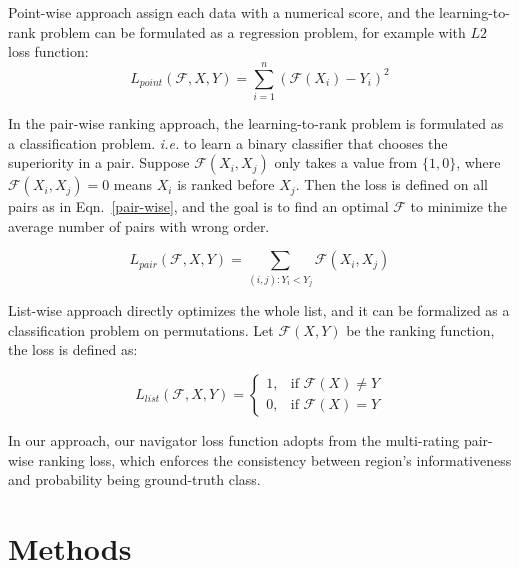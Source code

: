 \documentclass[runningheads]{llncs}
\begin{document}
Point-wise approach assign each data with a numerical score, and the learning-to-rank problem can be formulated as a regression problem,  for example with $L2$ loss function:
\begin{equation}
	\label{point-wise}
	L_{point}(\mathcal F, X, Y) = \sum_{i=1}^n (\mathcal F(X_i)-Y_i)^2 
\end{equation}

In the pair-wise ranking approach, the learning-to-rank problem is formulated as a classification problem. \emph{i.e.} to learn a binary classifier that chooses the superiority in a pair. Suppose $\mathcal F(X_i,X_j)$ only takes a value from $\{1, 0\}$, where $\mathcal F(X_i,X_j) = 0$ means $X_i$ is ranked before $X_j$. Then the loss is defined on all pairs as in Eqn.~\ref{pair-wise}, and the goal is to find an optimal $\mathcal F$ to minimize the average number of pairs with wrong order.

\begin{equation}
	\label{pair-wise}
	L_{pair}(\mathcal F, X, Y) = \sum_{(i,j):Y_i < Y_j} \mathcal F(X_i, X_j)
\end{equation}

List-wise approach directly optimizes the whole list, and it can be formalized as a classification problem on permutations. Let $\mathcal F(X, Y)$ be the ranking function, the loss is defined as:

\begin{equation}
	\label{list-wise}
	L_{list}(\mathcal F, X, Y)= 
	\begin{cases}
    	1,   & \text{if  }\mathcal F(X) \neq Y \\
    	0,   & \text{if  }\mathcal F(X) = Y
	\end{cases}
\end{equation}

In our approach, our navigator loss function adopts from the multi-rating pair-wise ranking loss, which enforces the consistency between region's informativeness and probability being ground-truth class. 


\section{Methods}\label{methods}
\end{document}
